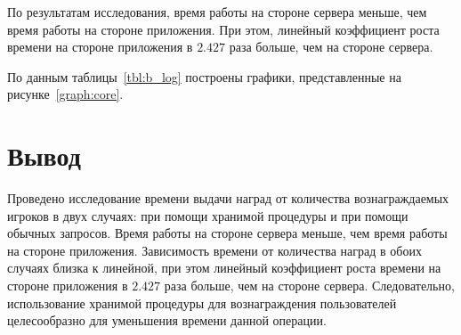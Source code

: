 По результатам исследования, время работы на стороне сервера меньше, чем время работы на стороне приложения. При этом, линейный коэффициент роста времени на стороне приложения в $2.427$ раза больше, чем на стороне сервера.

По данным таблицы~\ref{tbl:b_log} построены графики, представленные на рисунке~\ref{graph:core}.

\section*{Вывод}

Проведено исследование времени выдачи наград от количества вознаграждаемых игроков в двух случаях: при помощи хранимой процедуры и при помощи обычных запросов. Время работы на стороне сервера меньше, чем время работы на стороне приложения. Зависимость времени от количества наград в обоих случаях близка к линейной, при этом линейный коэффициент роста времени на стороне приложения в $2.427$ раза больше, чем на стороне сервера. Следовательно, использование хранимой процедуры для вознаграждения пользователей целесообразно для уменьшения времени данной операции.

\clearpage
